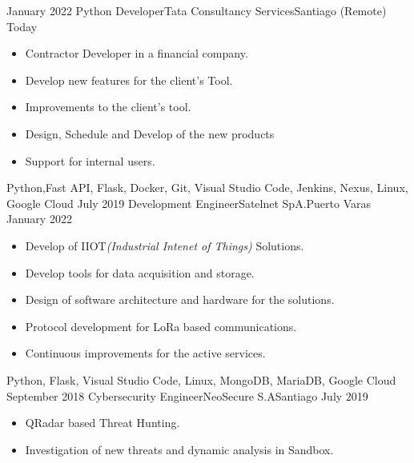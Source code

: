 %
%
%

\begin{experiences}
  \experience
    {January 2022}   {Python Developer}{Tata Consultancy Services}{Santiago (Remote)}
    {Today} 
    {
      \begin{itemize}
        \item Contractor Developer in a financial company.
        \item Develop new features for the client's Tool.
        \item Improvements to the client's tool.
        \item Design, Schedule and Develop of the new products
        \item Support for internal users.
      \end{itemize}
    }{Python,Fast API, Flask, Docker, Git, Visual Studio Code, Jenkins, Nexus, Linux, Google Cloud}
  \emptySeparator
  \experience
    {July 2019} {Development Engineer}{Satelnet SpA.}{Puerto Varas}
    {January 2022}    
    {
      \begin{itemize}
        \item Develop of IIOT{\it (Industrial Intenet of Things)} Solutions.
        \item Develop tools for data acquisition and storage.
        \item Design of software architecture and hardware for the solutions.
        \item Protocol development for LoRa based communications.
        \item Continuous improvements for the active services.                           
      \end{itemize}
    }{Python, Flask, Visual Studio Code, Linux, MongoDB, MariaDB, Google Cloud}
  \emptySeparator
  \experience
    {September 2018}     {Cybersecurity Engineer}{NeoSecure S.A}{Santiago}
    {July 2019}    
    {
      \begin{itemize}
        \item QRadar based Threat Hunting.
        \item Investigation of new threats and dynamic analysis in Sandbox.              

\end{itemize}}
\end{experiences}
